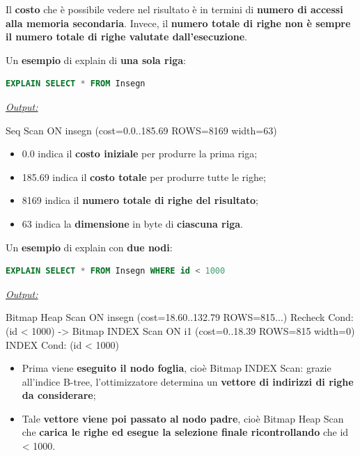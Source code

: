 \documentclass[a4paper]{article}
\begin{document}
	\noindent
	Il \textbf{costo} che è possibile vedere nel risultato è in termini di \textbf{numero di accessi alla memoria secondaria}. Invece, il \textbf{numero totale di righe non è sempre il numero totale di righe valutate dall'esecuzione}.\newline

	\noindent
	Un \textcolor{Green4}{\textbf{esempio}} di \textsf{explain} di \textbf{una sola riga}:
	\begin{lstlisting}[language=SQL]
EXPLAIN SELECT * FROM Insegn\end{lstlisting}
	\emph{\underline{Output:}}\newline

	\noindent
	\textsf{Seq Scan ON insegn (cost=0.0..185.69 ROWS=8169 width=63)}
	\begin{itemize}
		\item \textsf{0.0} indica il \textbf{costo iniziale} per produrre la prima riga;
		\item \textsf{185.69} indica il \textbf{costo totale} per produrre tutte le righe;
		\item \textsf{8169} indica il \textbf{numero totale di righe del risultato};
		\item \textsf{63} indica la \textbf{dimensione} in byte di \textbf{ciascuna riga}.
	\end{itemize}\:\newline

	\noindent
	Un \textcolor{Green4}{\textbf{esempio}} di \textsf{explain} con \textbf{due nodi}:
	\begin{lstlisting}[language=SQL]
EXPLAIN SELECT * FROM Insegn WHERE id < 1000\end{lstlisting}
	\emph{\underline{Output:}}\newline

	\noindent
	\textsf{Bitmap Heap Scan ON insegn (cost=18.60..132.79 ROWS=815...)}\newline
	\textsf{Recheck Cond: (id < 1000)}\newline
	\textsf{-> Bitmap INDEX Scan ON i1 (cost=0..18.39 ROWS=815 width=0)}\newline
	\textsf{\phantom{-> }INDEX Cond: (id < 1000)}
	\begin{itemize}
		\item Prima viene \textbf{eseguito il nodo foglia}, cioè \textsf{Bitmap INDEX Scan}: grazie all'indice B-tree, l'ottimizzatore determina un \textbf{vettore di indirizzi di righe da considerare};
		\item Tale \textbf{vettore viene poi passato al nodo padre}, cioè \textsf{Bitmap Heap Scan} che \textbf{carica le righe ed esegue la selezione finale ricontrollando} che \textsf{id < 1000}.
	\end{itemize}\newpage
\end{document}
